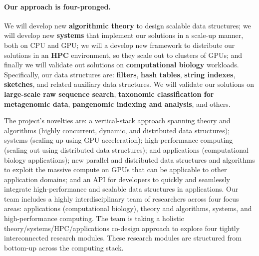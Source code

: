 \paragraph{Our approach is four-pronged.}  We will develop new \textbf{algorithmic theory} to design scalable data structures; we will develop new \textbf{systems} that implement our solutions in a scale-up manner,  both on CPU and GPU\@; we will a develop new framework to distribute our solutions in an \textbf{HPC} environment, so they scale out to clusters of GPUs; and finally we will validate out solutions on \textbf{computational biology} workloads.
%
Specifically, our data structures are: \textbf{filters}, \textbf{hash tables}, \textbf{string indexes}, \textbf{sketches}, and related auxiliary data structures.  We will validate our solutions on \textbf{large-scale raw sequence search}, \textbf{taxonomic classification for metagenomic data}, \textbf{pangenomic indexing and analysis}, and others.


The project’s novelties are: a vertical-stack approach spanning theory and algorithms (highly concurrent, dynamic, and distributed data structures); systems (scaling up using GPU acceleration); high-performance computing (scaling out using distributed data structures); and applications (computational biology applications); new parallel and distributed data structures and algorithms to exploit the massive compute on GPUs that can be applicable to other application domains; and an API for developers to quickly and seamlessly integrate high-performance and scalable data structures in applications.
%
Our team includes a highly interdisciplinary team of researchers across four focus areas: applications (computational biology), theory and algorithms, systems, and high-performance computing. The team is taking a holistic theory/systems/HPC/applications co-design approach to explore four tightly interconnected research modules. These research modules are structured from bottom-up across the computing stack.

